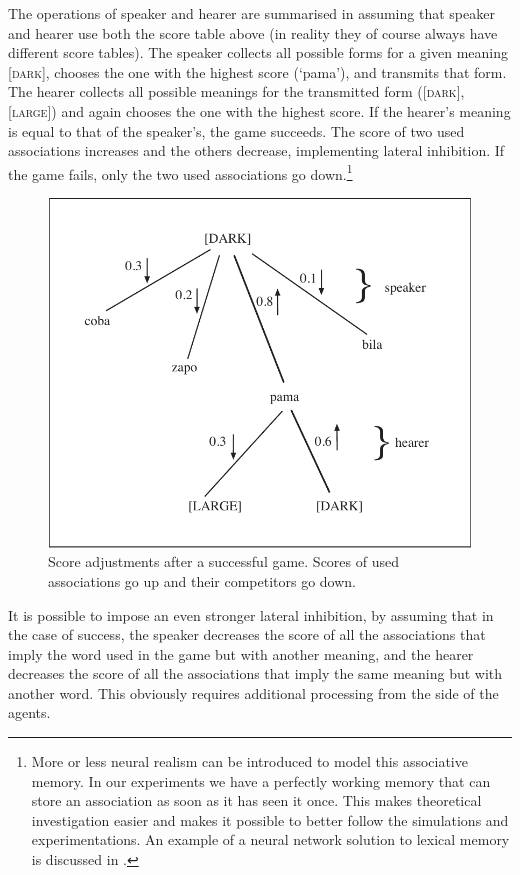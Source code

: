 The operations of speaker and hearer are summarised in 
 assuming that speaker and hearer
use both the score table above (in reality they of 
course always have different score tables). 
The speaker collects all possible
forms for a given meaning [\textsc{dark}], chooses the one with the
highest score (`pama'), and transmits that form. 
The hearer collects all possible meanings for 
the transmitted form ([\textsc{dark}], [\textsc{large}]) and again chooses the one with
the highest score. If the hearer's meaning is equal to that
of the speaker's, the game succeeds. The score of 
two used associations increases and the others
decrease, implementing lateral 
inhibition. If the game fails, only the two used associations 
go down.\footnote{More or less neural realism can be introduced to 
model this associative memory. In our experiments we 
have a perfectly working memory that can store an 
association as soon as it has seen it once. This makes
theoretical investigation easier and makes it possible
to better follow the simulations and experimentations.  
An example of a neural network solution to lexical
memory is discussed in \cite{Cangelosi:1996}.}


\begin{figure}[htbp]
  \centerline{\includegraphics[width=.60\textwidth]{chap5/figs/incr-decr.pdf}}
\caption{\label{incr-decr}Score adjustments after a successful game. Scores of used 
associations go up and their competitors go down.}
\end{figure}

It is possible to impose an even stronger
lateral inhibition, by assuming that in the case of 
success, the speaker decreases the score of 
all the associations that imply the word used in 
the game but with another meaning, and the 
hearer decreases the score of all the associations
that imply the same meaning but with another 
word. This obviously requires additional processing
from the side of the agents. 

